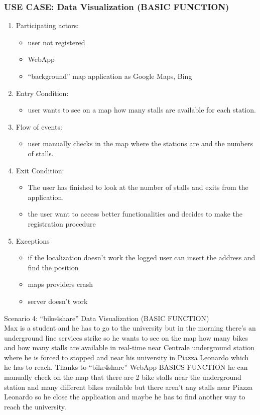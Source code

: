 \documentclass{article}
\begin{document}
\subsubsection{\textbf{USE CASE}: Data Visualization (BASIC FUNCTION)}
\begin{enumerate}
\item Participating actors: 
\begin{itemize}
    \item user not registered
    \item WebApp
    \item “background” map application as Google Maps, Bing
\end{itemize}
\item Entry Condition: 
\begin{itemize}
    \item user wants to see on a map how many stalls are available for each station.
\end{itemize}
\item Flow of events: 
\begin{itemize}
    \item user manually checks in the map where the stations are and the numbers of stalls.
\end{itemize}
\item Exit Condition: 
\begin{itemize}
    \item The user has finished to look at the number of stalls and exits from the application. 
    \item the user want to access better functionalities and decides to make the registration procedure
\end{itemize}
\item Exceptions
\begin{itemize}
    \item if the localization doesn’t work the logged user can insert the address and find the position
    \item maps providers crash
    \item server doesn’t work
\end{itemize}
\end{enumerate}

Scenario 4: “bike4share” Data Visualization (BASIC FUNCTION) \\
Max is a student and he has to go to the university but in the morning there’s an underground line services strike so he wants to see on the map how many bikes and how many stalls are available in real-time near Centrale underground station where he is forced to stopped and near his university in Piazza Leonardo which he has to reach. 
Thanks to “bike4share” WebApp BASICS FUNCTION he can manually check on the map that there are 2 bike stalls near the underground station and many different bikes available but there aren’t any stalls near Piazza Leonardo so he close the application and maybe he has to find another way to reach the university.
\end{document}
